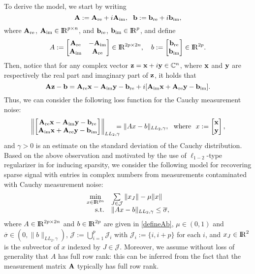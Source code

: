 \documentclass[10pt]{article}
\numberwithin{equation}{section}
\def\R{{\rm I\!R}}
\def\hx{{\widehat x}}
\begin{document}
{To derive the model, we start by writing
\[
{\bf A} := {\bf A}_{\rm re} + i {\bf A}_{\rm im}, \ \ {\bf b} := {\bf b}_{\rm re} + i {\bf b}_{\rm im},
\]
where ${\bf A}_{\rm re}$, ${\bf A}_{\rm im}\in \R^{p\times n}$, and ${\bf b}_{\rm re}$, ${\bf b}_{\rm im}\in \R^{p}$, and define
\begin{equation}\label{defineAb}
A := \begin{bmatrix}
{\bf A}_{\rm re} & -{\bf A}_{\rm im}\\
{\bf A}_{\rm im} & {\bf A}_{\rm re}
\end{bmatrix}\in \R^{2p\times 2n},\ \ \ b:= \begin{bmatrix}
  {\bf b}_{\rm re}\\{\bf b}_{\rm im}
\end{bmatrix}\in \R^{2p}.
\end{equation}
Then, notice that for any complex vector ${\bf z} = {\bf x} + i {\bf y}\in {\mathbb{C}}^n$, where ${\bf x}$ and ${\bf y}$ are respectively the real part and imaginary part of ${\bf z}$, it holds that
\[
{\bf A}{\bf z} - {\bf b} = {\bf A}_{\rm re}{\bf x} - {\bf A}_{\rm im}{\bf y} - {\bf b}_{\rm re} + i [{\bf A}_{\rm im}{\bf x} + {\bf A}_{\rm re}{\bf y} - {\bf b}_{\rm im}].
\]
Thus, we can consider the following loss function for the Cauchy measurement noise:
\[
\left\|
\begin{bmatrix}
  {\bf A}_{\rm re}{\bf x} - {\bf A}_{\rm im}{\bf y} - {\bf b}_{\rm re}\\
  {\bf A}_{\rm im}{\bf x} + {\bf A}_{\rm re}{\bf y} - {\bf b}_{\rm im}
\end{bmatrix} \right\|_{LL_2,\gamma} \!\!\!\!\! = \|Ax - b\|_{LL_2,\gamma},\ \ {\rm where}\ \ x := \begin{bmatrix}
  {\bf x}\\{\bf y}
\end{bmatrix},
\]
and $\gamma > 0$ is an estimate on the standard deviation of the Cauchy distribution.
Based on the above observation and motivated by the use of $\ell_{1-2}$-type regularizer in \cite{YiLH15} for inducing sparsity, we consider the following model for recovering sparse signal with entries in complex numbers from measurements contaminated with Cauchy measurement noise:
\begin{equation}\label{E2}
  \begin{array}{rl}
\min\limits_{x\in\R^{2n}} & \sum\limits_{J\in\mathcal{J}}\|x_J\| - \mu\|x\| \\
{\rm s.t.} & \|Ax - b\|_{LL_2,\gamma}\leq \overline{\sigma},
  \end{array}
\end{equation}
where $A\in\R^{2p\times 2n}$ and $b\in \R^{2p}$ are given in \eqref{defineAb}, $\mu \in (0,1)$ and $\overline{\sigma} \in (0,\|b\|_{LL_2,\gamma})$, $\mathcal{J} := \bigcup_{i=1}^p\mathcal{J}_i$ with $\mathcal{J}_i := \{i,i+p\}$ for each $i$, and $x_J\in\R^2$ is the subvector of $x$ indexed by $J\in\mathcal{J}$. Moreover, we assume without loss of generality that $A$ has full row rank: this can be inferred from the fact that the measurement matrix ${\bf A}$ typically has full row rank. %

}
\end{document}
